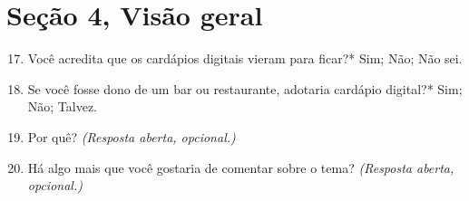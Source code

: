 \section*{Seção 4, Visão geral}

\begin{enumerate}\setcounter{enumi}{16}
	\item Você acredita que os cardápios digitais vieram para ficar?* Sim; Não; Não sei.
	\item Se você fosse dono de um bar ou restaurante, adotaria cardápio digital?* Sim; Não; Talvez.
	\item Por quê? \emph{(Resposta aberta, opcional.)}
	\item Há algo mais que você gostaria de comentar sobre o tema? \emph{(Resposta aberta, opcional.)}
\end{enumerate}
